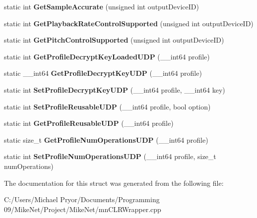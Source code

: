 \begin{DoxyCompactItemize}
\item 
\hypertarget{structmn_c_l_r_ae286cf439ee31c7f1b7ccf698cd741a5}{
static int {\bfseries GetSampleAccurate} (unsigned int outputDeviceID)}
\label{structmn_c_l_r_ae286cf439ee31c7f1b7ccf698cd741a5}

\item 
\hypertarget{structmn_c_l_r_a1d5460c73a1ac801d4877c41c6b60e61}{
static int {\bfseries GetPlaybackRateControlSupported} (unsigned int outputDeviceID)}
\label{structmn_c_l_r_a1d5460c73a1ac801d4877c41c6b60e61}

\item 
\hypertarget{structmn_c_l_r_a5d844f461f1b6b9247f2564208a9805c}{
static int {\bfseries GetPitchControlSupported} (unsigned int outputDeviceID)}
\label{structmn_c_l_r_a5d844f461f1b6b9247f2564208a9805c}

\item 
\hypertarget{structmn_c_l_r_a4f130d707abe386066b2b7241d9c470f}{
static int {\bfseries GetProfileDecryptKeyLoadedUDP} (\_\-\_\-int64 profile)}
\label{structmn_c_l_r_a4f130d707abe386066b2b7241d9c470f}

\item 
\hypertarget{structmn_c_l_r_a69ed5a65cf85640c2119d22ee0c0f0e5}{
static \_\-\_\-int64 {\bfseries GetProfileDecryptKeyUDP} (\_\-\_\-int64 profile)}
\label{structmn_c_l_r_a69ed5a65cf85640c2119d22ee0c0f0e5}

\item 
\hypertarget{structmn_c_l_r_a6035b7c5f7507868ca35543eb47236e5}{
static int {\bfseries SetProfileDecryptKeyUDP} (\_\-\_\-int64 profile, \_\-\_\-int64 key)}
\label{structmn_c_l_r_a6035b7c5f7507868ca35543eb47236e5}

\item 
\hypertarget{structmn_c_l_r_a9fadd985310a6a4ca475c953f6ab86a9}{
static int {\bfseries SetProfileReusableUDP} (\_\-\_\-int64 profile, bool option)}
\label{structmn_c_l_r_a9fadd985310a6a4ca475c953f6ab86a9}

\item 
\hypertarget{structmn_c_l_r_a4921c52f90b95f5843c2802bc1cb63ed}{
static int {\bfseries GetProfileReusableUDP} (\_\-\_\-int64 profile)}
\label{structmn_c_l_r_a4921c52f90b95f5843c2802bc1cb63ed}

\item 
\hypertarget{structmn_c_l_r_a18f587c45c424e457dd9f4370e459e18}{
static size\_\-t {\bfseries GetProfileNumOperationsUDP} (\_\-\_\-int64 profile)}
\label{structmn_c_l_r_a18f587c45c424e457dd9f4370e459e18}

\item 
\hypertarget{structmn_c_l_r_ac6035c85b6a25bafc3f6924a8c890247}{
static int {\bfseries SetProfileNumOperationsUDP} (\_\-\_\-int64 profile, size\_\-t numOperations)}
\label{structmn_c_l_r_ac6035c85b6a25bafc3f6924a8c890247}

\end{DoxyCompactItemize}


The documentation for this struct was generated from the following file:\begin{DoxyCompactItemize}
\item 
C:/Users/Michael Pryor/Documents/Programming 09/MikeNet/Project/MikeNet/mnCLRWrapper.cpp\end{DoxyCompactItemize}
